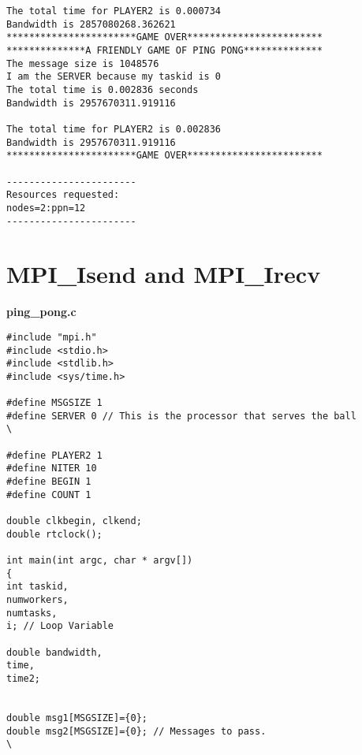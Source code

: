 \documentclass[11pt]{article}
\begin{document}
\begin{enumerate}
\begin{center}
\begin{lstlisting}
The total time for PLAYER2 is 0.000734
Bandwidth is 2857080268.362621
***********************GAME OVER************************
**************A FRIENDLY GAME OF PING PONG**************
The message size is 1048576
I am the SERVER because my taskid is 0
The total time is 0.002836 seconds
Bandwidth is 2957670311.919116

The total time for PLAYER2 is 0.002836
Bandwidth is 2957670311.919116
***********************GAME OVER************************

-----------------------
Resources requested:
nodes=2:ppn=12
-----------------------
\end{lstlisting}
\end{center}
\section{MPI\_Isend and MPI\_Irecv}
\begin{center}
\textbf{ping\_pong.c}
\begin{lstlisting}
#include "mpi.h"
#include <stdio.h>
#include <stdlib.h>
#include <sys/time.h>

#define MSGSIZE 1
#define SERVER 0 // This is the processor that serves the ball                                                                                                                                                \
																																														   
#define PLAYER2 1
#define NITER 10
#define BEGIN 1
#define COUNT 1

double clkbegin, clkend;
double rtclock();

int main(int argc, char * argv[])
{
int taskid,
numworkers,
numtasks,
i; // Loop Variable                                                                                                                                                                                        

double bandwidth,
time,
time2;


double msg1[MSGSIZE]={0};
double msg2[MSGSIZE]={0}; // Messages to pass.                                                                                                                                                              \
																																														   


\end{lstlisting}
\end{center}
\end{enumerate}
\end{document}
